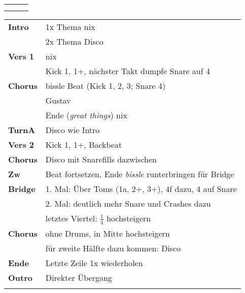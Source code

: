 

\begin{tabular}{p{0.6cm}p{12cm}p{1.4cm}}
	\rowcolor{cyan} \myRow{\thesongnumber} & \myRow{Great Things} & \myRow{102} \\
	                                       &                      &             \\
\end{tabular}

\begin{tabular}{p{1.6cm}l}
	\textbf{Intro}  & 1x Thema nix                                                   \\
	                & 2x Thema Disco                                                 \\
	\textbf{Vers 1} & nix                                                            \\
	                & Kick 1, 1+, nächster Takt dumpfe Snare auf 4                   \\
	\textbf{Chorus} & bissle Beat (Kick 1, 2, 3; Snare 4)                            \\
	                & Gustav                                                         \\
	                & Ende (\textit{great things}) nix                               \\
	\textbf{TurnA}  & Disco wie Intro                                                \\
	\textbf{Vers 2} & Kick 1, 1+, Backbeat                                           \\
	\textbf{Chorus} & Disco mit Snarefills dazwischen                                \\
	\textbf{Zw}     & Beat fortsetzen, Ende \textit{bissle} runterbringen für Bridge \\
	\textbf{Bridge} & 1. Mal: Über Toms (1a, 2+, 3+), 4f dazu, 4 auf Snare           \\
	                & 2. Mal: deutlich mehr Snare und Crashes dazu                   \\
	                & letztes Viertel: $\frac{1}{4}$ hochsteigern                    \\
	\textbf{Chorus} & ohne Drums, in Mitte hochsteigern                              \\
	                & für zweite Hälfte dazu kommen: Disco                           \\
	\textbf{Ende}   & Letzte Zeile 1x wiederholen                                    \\
	\textbf{Outro}  & Direkter Übergang                                              \\
	                &                                                                \\
\end{tabular}

